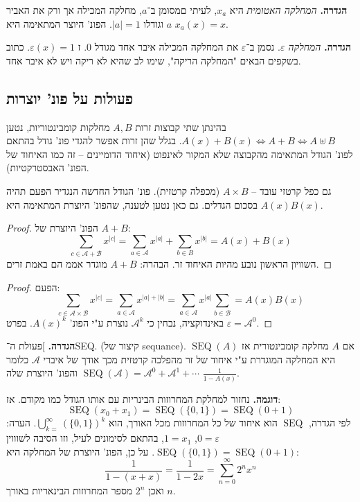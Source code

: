 \documentclass[]{article}
\newcommand\ac    {\mathcal{A}}
\newcommand\bc    {\mathcal{B}}
\newcommand\epsi  {\varepsilon}
\DeclareMathOperator\seq   {SEQ}
\renewcommand\inf {\infty}
\begin{document}
	\textbf{הגדרה. }\textit{המחלקה האטומית} היא $x_a$, לעיתי םמסומן ב־$a$, מחלקה המכילה אך ורק את האביר $a$ וגודלו $|a| = 1$. הפונ' היוצר המתאימה היא $x_a(x) = x$. 
	
	\textbf{הגדרה. }\textit{המחלקה $\epsi$}. נסמן ב־$\epsi$ את המחלקה המכילה איבר אחד מגודל $0$. ז $\epsi(x) = 1$. כתוב בשקפים הבאים "המחלקה הריקה", שימו לב שהיא לא ריקה ויש לא איבר אחד. 
	
	\subsection{פעולות על פונ' יוצרות}
	בהינתן שתי קבוצות זרות $A, B$ מחלקות קומבינטוריות, נטען $A(x) + B(x) \iff A + B \iff A \uplus B$. בגלל שהן זרות אפשר להגדי פונ' גודל בהתאם לפונ' הגודל המתאימה מהקבוצה שלא המקור לאינפוט (איחוד הדומיינים – זה כמו האיחוד של הפונ' האבסטרקטיות). 
	
	גם כפל קרטזי עובד – $A \times B$ (מכפלה קרטזית). פונ' הגודל החדשה הנגדיר הפעם תהיה בסכום הגדלים. גם כאן נטען לטענה, שהפונ' היוצרת המתאימה היא $A(x)B(x)$. 
	
	\begin{proof}
		הפונ' היוצרת של $A +B$: 
		\[ \sum_{c \in \ac + \bc} x^{|c|} = \sum_{a \in \ac} x^{|a|} + \sum_{b \in B} x^{|b|} = A(x) + B(x) \]
		השוויון הראשון נובע מהיות האיחוד זר. הבהרה: $A + B$ מוגדר אממ הם באמת זרים. 
	\end{proof}
	\begin{proof}
		הפעם: 
		\[ \sum_{c \in \ac \times \bc} x^{|c|} = \sum_{a \in \ac} x^{|a| + |b|} = \sum_{a \in \ac} x^{|a|} \sum_{b \in \bc} = A(x)B(x) \]
		באינדוקציה, נבחין כי $\ac^k$ נוצרת ע"י הפונ' $A(x)^{k}$. בפרט $\epsi = \ac^{0}$. 
	\end{proof}
	
	\textbf{הגדרה. }]פעולת ה־SEQ. (קיצור של sequance). אם $A$ מחלקה קומבינטורית אז $\seq(A)$ היא המחלקה המוגדרת ע"י איחוד של זר מהפלכה קרטזית מכך אודך של איברי $\ac$ כלומר 
	$\seq(\ac) = \ac^{0} + \ac^{1} + \cdots$
	והפונ' היוצרת שלה $\frac{1}{1 - A(x)}$. 
	
	\textbf{דוגמה. }נחזור למחלקת המחרוזות הבינריות עם אותו הגודל כמו מקודם. אז: 
	\[ \seq(x_0 + x_1) = \seq(\{0, 1\}) = \seq(0 + 1) \]
	לפי הגדרה, $\seq$ הוא איחוד של כל המחרוזות מכל האורך, הוא $\bigcup_{k = }^{\inf} (\{0, 1\})^{k}$. הערה: $0 = \epsi$, $1 =  x_1$, בהתאם לסימונים לעיל, וזו הסיבה לשוווין $\seq(\{0, 1\})  = \seq(0 + 1)$. על כן, הפונ' היוצרת של המחלקה היא:
	 \[ \frac{1}{1 - (x + x)} = \frac{1}{1 - 2x} = \sum_{n = 0}^{\inf}2^{n}x^{n} \]
	 ואכן $2^n$ מספר המחרוזות הבינאריות באורך $n$. 
	 
\end{document}

